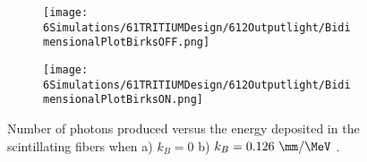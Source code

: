 \begin{figure}
\centering
    \begin{subfigure}[b]{0.4\textwidth}
    \centering
    \texttt{[image: 6Simulations/61TRITIUMDesign/612Outputlight/BidimensionalPlotBirksOFF.png]}  
    \caption{\label{subfig:2DimPlotNoBirks}}
    \end{subfigure}
    \hfill
    \begin{subfigure}[b]{0.4\textwidth}
    \centering
    \texttt{[image: 6Simulations/61TRITIUMDesign/612Outputlight/BidimensionalPlotBirksON.png]}  
    \caption{\label{subfig:2DimPlotBirks}}
    \end{subfigure}
 \caption{Number of photons produced versus the energy deposited in the scintillating fibers when a) $k_B=0$ b) $k_B=0.126~\mm/\MeV$ \cite{SimulationPaperCarlos}.}
 \label{fig:2DimPlotBirks}
\end{figure}